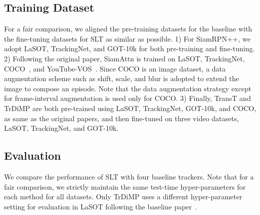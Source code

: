 \subsection{Training Dataset}

For a fair comparison, we aligned the pre-training datasets for the baseline with the fine-tuning datasets for SLT as similar as possible.
1) For SiamRPN++, we adopt LaSOT, TrackingNet, and GOT-10k for both pre-training and fine-tuning.
2) Following the original paper, SiamAttn is trained on LaSOT, TrackingNet, COCO~\cite{coco}, and YouTube-VOS~\cite{ytvos}.
Since COCO is an image dataset, a data augmentation scheme such as shift, scale, and blur is adopted to extend the image to compose an episode.
Note that the data augmentation strategy except for frame-interval augmentation is used only for COCO.
3) Finally, TransT and TrDiMP are both pre-trained using  LaSOT, TrackingNet, GOT-10k, and COCO, as same as the original papers, and then fine-tuned on three video datasets, LaSOT, TrackingNet, and GOT-10k.







\subsection{Evaluation}

We compare the performance of SLT with four baseline trackers. Note that for a fair comparison, we strictly maintain the same test-time hyper-parameters for each method for all datasets.
Only TrDiMP uses a different hyper-parameter setting for evaluation in LaSOT following the baseline paper~\cite{trdimp}.


